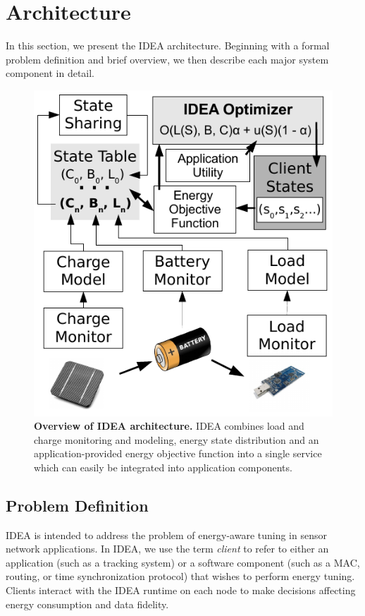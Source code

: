 \vfill\eject
\section{Architecture}
\label{idea-sec-architecture}

In this section, we present the IDEA architecture. Beginning with a formal
problem definition and brief overview, we then describe each major system
component in detail.

\begin{figure}[t]
\begin{center}
\includegraphics[width=0.5\hsize]{./5-idea/figs/architecture.pdf}
\end{center}

\caption{\textbf{Overview of IDEA architecture.} IDEA combines load and
charge monitoring and modeling, energy state distribution and an
application-provided energy objective function into a single service which
can easily be integrated into application components.}

\label{idea-fig-architecture}
\end{figure}

\subsection{Problem Definition}

IDEA is intended to address the problem of energy-aware tuning in sensor
network applications. In IDEA, we use the term \textit{client} to refer to
either an application (such as a tracking system) or a software component
(such as a MAC, routing, or time synchronization protocol) that wishes to
perform energy tuning. Clients interact with the IDEA runtime on each node to
make decisions affecting energy consumption and data fidelity.

\vfill\eject

